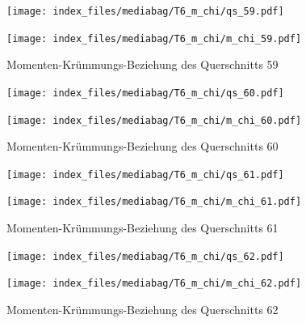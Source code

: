 \documentclass[
  11pt,
  letterpaper,
]{scrreprt}
\begin{document}
\begin{figure}[H]

\begin{minipage}{0.50\linewidth}
\texttt{[image: index\_files/mediabag/T6\_m\_chi/qs\_59.pdf]}\end{minipage}%
%
\begin{minipage}{0.50\linewidth}
\texttt{[image: index\_files/mediabag/T6\_m\_chi/m\_chi\_59.pdf]}\end{minipage}%

\caption{\label{fig-m_chi_appendix}Momenten-Krümmungs-Beziehung des
Querschnitts 59}

\end{figure}%

\begin{figure}[H]

\begin{minipage}{0.50\linewidth}
\texttt{[image: index\_files/mediabag/T6\_m\_chi/qs\_60.pdf]}\end{minipage}%
%
\begin{minipage}{0.50\linewidth}
\texttt{[image: index\_files/mediabag/T6\_m\_chi/m\_chi\_60.pdf]}\end{minipage}%

\caption{\label{fig-m_chi_appendix}Momenten-Krümmungs-Beziehung des
Querschnitts 60}

\end{figure}%

\begin{figure}[H]

\begin{minipage}{0.50\linewidth}
\texttt{[image: index\_files/mediabag/T6\_m\_chi/qs\_61.pdf]}\end{minipage}%
%
\begin{minipage}{0.50\linewidth}
\texttt{[image: index\_files/mediabag/T6\_m\_chi/m\_chi\_61.pdf]}\end{minipage}%

\caption{\label{fig-m_chi_appendix}Momenten-Krümmungs-Beziehung des
Querschnitts 61}

\end{figure}%

\begin{figure}[H]

\begin{minipage}{0.50\linewidth}
\texttt{[image: index\_files/mediabag/T6\_m\_chi/qs\_62.pdf]}\end{minipage}%
%
\begin{minipage}{0.50\linewidth}
\texttt{[image: index\_files/mediabag/T6\_m\_chi/m\_chi\_62.pdf]}\end{minipage}%

\caption{\label{fig-m_chi_appendix}Momenten-Krümmungs-Beziehung des
Querschnitts 62}

\end{figure}%
\end{document}
